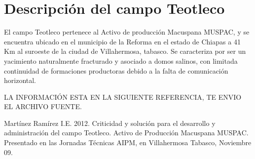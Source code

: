 \chapter{Descripción del campo Teotleco}
\label{chp:campo}

El campo Teotleco pertenece al Activo de producción Macuspana MUSPAC, y se encuentra ubicado en el municipio de la Reforma en el estado de Chiapas a 41 Km al suroeste de la ciudad de Villahermosa, tabasco. Se caracteriza por ser un yacimiento naturalmente fracturado y asociado a domos salinos, con limitada continuidad de formaciones productoras debido a la falta de comunicación horizontal. 


LA INFORMACIÓN ESTA EN LA SIGUIENTE REFERENCIA, TE ENVIO EL ARCHIVO FUENTE.

Martínez Ramírez I.E. 2012. Criticidad y solución para el desarrollo y administración del campo Teotleco. Activo de Producción Macuspana MUSPAC. Presentado en las Jornadas Técnicas AIPM, en Villahermosa Tabasco, Noviembre 09.